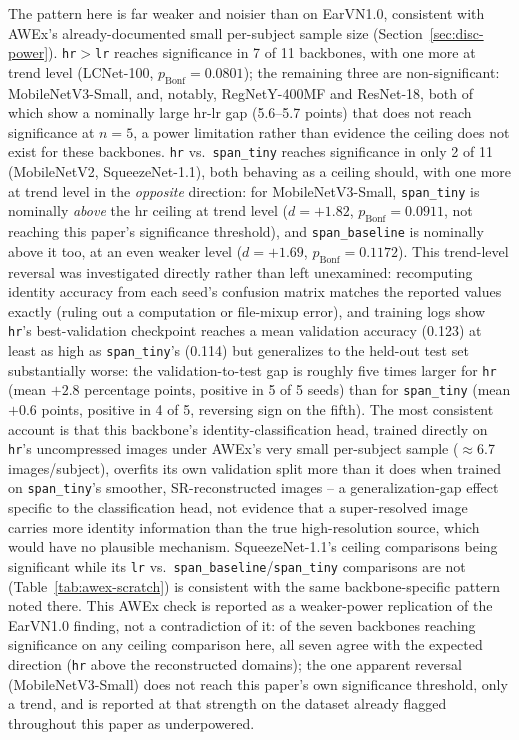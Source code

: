 \documentclass[11pt]{article}
\begin{document}
The pattern here is far weaker and noisier than on EarVN1.0, consistent with AWEx's already-documented small per-subject sample size (Section~\ref{sec:disc-power}). \texttt{hr}$>$\texttt{lr} reaches significance in 7 of 11 backbones, with one more at trend level (LCNet-100, $p_{\text{Bonf}}{=}0.0801$); the remaining three are non-significant: MobileNetV3-Small, and, notably, RegNetY-400MF and ResNet-18, both of which show a nominally large hr-lr gap (5.6--5.7 points) that does not reach significance at $n=5$, a power limitation rather than evidence the ceiling does not exist for these backbones. \texttt{hr} vs.\ \texttt{span\_tiny} reaches significance in only 2 of 11 (MobileNetV2, SqueezeNet-1.1), both behaving as a ceiling should, with one more at trend level in the \emph{opposite} direction: for MobileNetV3-Small, \texttt{span\_tiny} is nominally \emph{above} the hr ceiling at trend level ($d{=}{+}1.82$, $p_{\text{Bonf}}{=}0.0911$, not reaching this paper's significance threshold), and \texttt{span\_baseline} is nominally above it too, at an even weaker level ($d{=}{+}1.69$, $p_{\text{Bonf}}{=}0.1172$). This trend-level reversal was investigated directly rather than left unexamined: recomputing identity accuracy from each seed's confusion matrix matches the reported values exactly (ruling out a computation or file-mixup error), and training logs show \texttt{hr}'s best-validation checkpoint reaches a mean validation accuracy (0.123) at least as high as \texttt{span\_tiny}'s (0.114) but generalizes to the held-out test set substantially worse: the validation-to-test gap is roughly five times larger for \texttt{hr} (mean $+2.8$ percentage points, positive in 5 of 5 seeds) than for \texttt{span\_tiny} (mean $+0.6$ points, positive in 4 of 5, reversing sign on the fifth). The most consistent account is that this backbone's identity-classification head, trained directly on \texttt{hr}'s uncompressed images under AWEx's very small per-subject sample ($\approx$6.7 images/subject), overfits its own validation split more than it does when trained on \texttt{span\_tiny}'s smoother, SR-reconstructed images -- a generalization-gap effect specific to the classification head, not evidence that a super-resolved image carries more identity information than the true high-resolution source, which would have no plausible mechanism. SqueezeNet-1.1's ceiling comparisons being significant while its \texttt{lr} vs.\ \texttt{span\_baseline}/\texttt{span\_tiny} comparisons are not (Table~\ref{tab:awex-scratch}) is consistent with the same backbone-specific pattern noted there. This AWEx check is reported as a weaker-power replication of the EarVN1.0 finding, not a contradiction of it: of the seven backbones reaching significance on any ceiling comparison here, all seven agree with the expected direction (\texttt{hr} above the reconstructed domains); the one apparent reversal (MobileNetV3-Small) does not reach this paper's own significance threshold, only a trend, and is reported at that strength on the dataset already flagged throughout this paper as underpowered.
\end{document}
